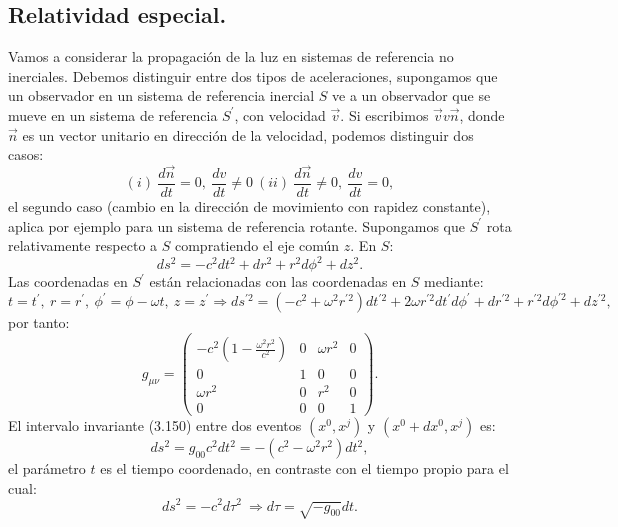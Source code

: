 \subsection{Relatividad especial.}
Vamos a considerar la propagación de la luz en sistemas de referencia no inerciales. Debemos distinguir entre dos tipos de aceleraciones, supongamos que un observador en un sistema de referencia inercial $S$ ve a un observador que se mueve en un sistema de referencia $S^{'}$, con velocidad $\vec{v}$. Si escribimos $\vec{v}v\vec{n}$, donde $\vec{n}$ es un vector unitario en dirección de la velocidad, podemos distinguir dos casos:
\begin{equation}
(i)\ \frac{d\vec{n}}{dt}=0,\ \frac{dv}{dt}\neq0\ (ii)\ \frac{d\vec{n}}{dt}\neq0,\ \frac{dv}{dt}=0,
\end{equation}
el segundo caso (cambio en la dirección de movimiento con rapidez constante), aplica por ejemplo para un sistema de referencia rotante. Supongamos que $S^{'}$ rota relativamente respecto a $S$ compratiendo el eje común $z$. En $S$:
\begin{equation}
ds^{2}=-c^{2}dt^{2}+dr^{2}+r^{2}d\phi^{2}+dz^{2}.
\end{equation}
Las coordenadas en $S^{'}$ están relacionadas con las coordenadas en $S$ mediante:
\begin{equation}
t=t^{'},\ r=r^{'},\ \phi^{'}=\phi-\omega t,\ z=z^{'}\Rightarrow ds^{'2}=(-c^{2}+\omega^{2}r^{'2})dt^{'2}+2\omega r^{'2}dt^{'}d\phi^{'}+dr^{'2}+r^{'2}d\phi^{'2}+dz^{'2},
\end{equation}
por tanto:
\begin{equation}
g_{\mu\nu}=\left(\begin{array}{cccc}
-c^2\left(1-\frac{\omega^{2}r^{2}}{c^{2}}\right) & 0 & \omega r^{2} & 0\\
0 & 1 & 0 & 0\\
\omega r^{2} & 0 & r^{2} & 0\\
0 & 0 & 0 & 1
\end{array}\right) .
\end{equation}
El intervalo invariante (3.150) entre dos eventos $(x^0,x^j)$ y $(x^0+dx^0,x^j)$ es:
\begin{equation}
ds^2=g_{00}c^2dt^2=-(c^2-\omega^2r^2)dt^2,
\end{equation} 
el parámetro $t$ es el tiempo coordenado, en contraste con el tiempo propio para el cual:
\begin{equation}
ds^2=-c^2d\tau^2 \ \Rightarrow d\tau=\sqrt{-g_{00}}dt. 
\end{equation}
